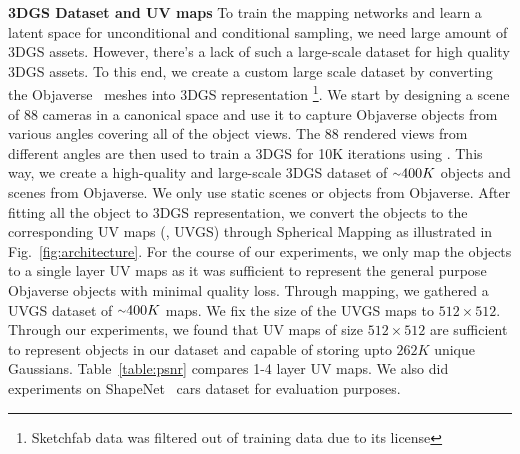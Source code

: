 \noindent\textbf{3DGS Dataset and UV maps}
To train the mapping networks and learn a latent space for unconditional and conditional sampling, we need large amount of 3DGS assets. 
However, there's a lack of such a large-scale dataset for high quality 3DGS assets. To this end, we create a custom large scale dataset by converting the Objaverse~\cite{objaverse2023} meshes into 3DGS representation \footnote{Sketchfab data was filtered out of training data due to its license}.
We start by designing a scene of 88 cameras in a canonical space and use it to capture Objaverse objects from various angles covering all of the object views.
The 88 rendered views from different angles are then used to train a 3DGS for 10K iterations using \cite{3dgs2023}. 
This way, we create a high-quality and large-scale 3DGS dataset of $\mytilde 400K$ objects and scenes from Objaverse.
We only use static scenes or objects from Objaverse.
After fitting all the object to 3DGS representation, we convert the objects to the corresponding UV maps (\ie, UVGS) through Spherical Mapping as illustrated in Fig.~\ref{fig:architecture}. 
For the course of our experiments, we only map the objects to a single layer UV maps as it was sufficient to represent the general purpose Objaverse objects with minimal quality loss. 
Through mapping, we gathered a UVGS dataset of  $\mytilde 400K$ maps.
We fix the size of the UVGS maps to $512\times512$. Through our experiments, we found that UV maps of size $512 \times 512$ are sufficient to represent objects in our dataset and capable of storing upto $262K$ unique Gaussians. 
Table~\ref{table:psnr} compares 1-4 layer UV maps. 
We also did experiments on ShapeNet~\cite{shapenet2015} cars dataset for evaluation purposes.

